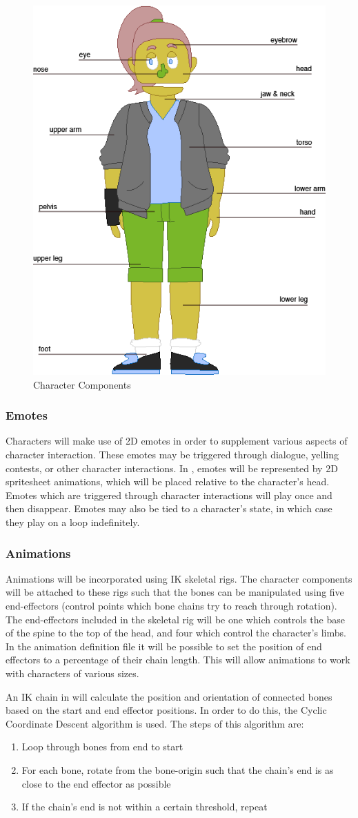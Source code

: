 \begin{figure}[H]
\centering\includegraphics[width=.4\linewidth]{images/character_components}
\caption{Character Components}
\label{fig:character_components}
\end{figure}

\subsubsection{Emotes}
Characters will make use of 2D emotes in order to supplement various aspects of character interaction. These emotes may be triggered through dialogue, yelling contests, or other character interactions. In \ourgame{}, emotes will be represented by 2D spritesheet animations, which will be placed relative to the character's head. Emotes which are triggered through character interactions will play once and then disappear. Emotes may also be tied to a character's state, in which case they play on a loop indefinitely.

\subsubsection{Animations}
Animations will be incorporated using IK skeletal rigs. The character components will be attached to these rigs such that the bones can be manipulated using five end-effectors (control points which bone chains try to reach through rotation). The end-effectors included in the skeletal rig will be one which controls the base of the spine to the top of the head, and four which control the character's limbs. In the animation definition file it will be possible to set the position of end effectors to a percentage of their chain length. This will allow animations to work with characters of various sizes.

An IK chain in \ourgame{} will calculate the position and orientation of connected bones based on the start and end effector positions. In order to do this, the Cyclic Coordinate Descent algorithm is used. The steps of this algorithm are:
\begin{enumerate}
\item{Loop through bones from end to start}
\item{For each bone, rotate from the bone-origin such that the chain's end is as close to the end effector as possible}
\item{If the chain's end is not within a certain threshold, repeat}
\end{enumerate}

